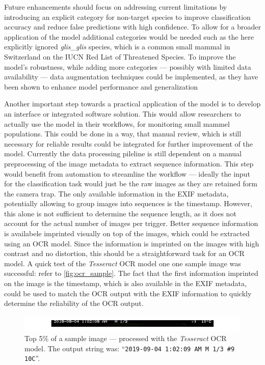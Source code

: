 Future enhancements should focus on addressing current limitations by introducing an explicit category for non-target species to improve classification accuracy and reduce false predictions with high confidence.
To allow for a broader application of the model additional categories would be needed such as the here explicitly ignored \textit{glis\_glis} species, which is a common small mammal in Switzerland on the IUCN Red List of Threatened Species.
To improve the model's robustness, while adding more categories --- possibly with limited data availability --- data augmentation techniques could be implemented, as they have been shown to enhance model performance and generalization \autocite{shortenSurveyImageData2019}

Another important step towards a practical application of the model is to develop an interface or integrated software solution.
This would allow researchers to actually use the model in their workflows, for monitoring small mammel populations.
This could be done in a way, that manual review, which is still necessary for reliable results could be integrated for further improvement of the model.
Currently the data processing pileline is still dependent on a manual preprocessing of the image metadata to extract sequence information.
This step would benefit from automation to streamline the workflow --- ideally the input for the classification task would just be the raw images as they are retained form the camera trap.
The only available information in the \ac{EXIF} metadata, potentially allowing to group images into sequences is the timestamp.
However, this alone is not sufficient to determine the sequence length, as it does not account for the actual number of images per trigger.
Better sequence information is availabele imprinted visually on top of the images, which could be extracted using an \ac{OCR} model.
Since the information is imprinted on the images with high contrast and no distortion, this should be a straightforward task for an \ac{OCR} model.
A quick test of the \textit{Tesseract} \ac{OCR} model one one sample image was successful: refer to \autoref{fig:ocr_sample}.
The fact that the first information imprinted on the image is the timestamp, which is also available in the \ac{EXIF} metadata, could be used to match the \ac{OCR} output with the \ac{EXIF} information to quickly determine the reliability of the \ac{OCR} output.

\begin{figure}[ht]
\centering
\includegraphics{figures/ocr_example.pdf}
\caption{Top 5\% of a sample image — processed with the \textit{Tesseract} \ac{OCR} model. The output string was: \enquote{\texttt{2019-09-04 1:02:09 AM M 1/3 \#9 10\textdegree C}}.}
\label{fig:ocr_sample}
\end{figure}


